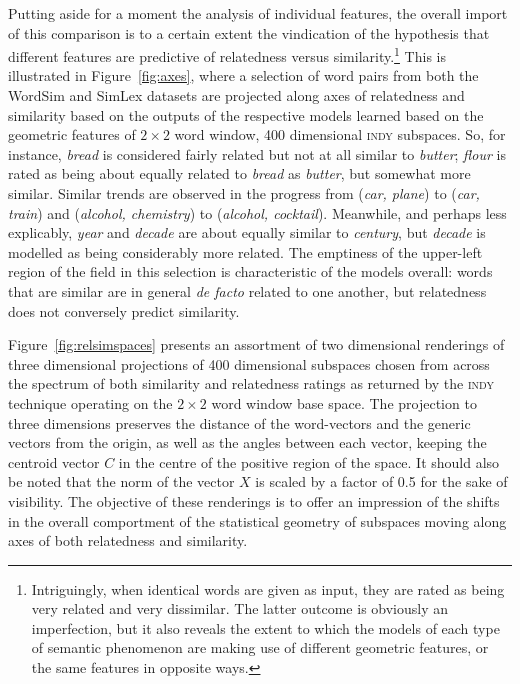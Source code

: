 Putting aside for a moment the analysis of individual features, the overall import of this comparison is to a certain extent the vindication of the hypothesis that different features are predictive of relatedness versus similarity.\footnote{Intriguingly, when identical words are given as input, they are rated as being very related and very dissimilar.  The latter outcome is obviously an imperfection, but it also reveals the extent to which the models of each type of semantic phenomenon are making use of different geometric features, or the same features in opposite ways.}  This is illustrated in Figure~\ref{fig:axes}, where a selection of word pairs from both the WordSim and SimLex datasets are projected along axes of relatedness and similarity based on the outputs of the respective models learned based on the geometric features of $2 \times 2$ word window, 400 dimensional \textsc{indy} subspaces.    So, for instance, \emph{bread} is considered fairly related but not at all similar to \emph{butter}; \emph{flour} is rated as being about equally related to \emph{bread} as \emph{butter}, but somewhat more similar.  Similar trends are observed in the progress from (\emph{car, plane}) to (\emph{car, train}) and (\emph{alcohol, chemistry}) to (\emph{alcohol, cocktail}).  Meanwhile, and perhaps less explicably, \emph{year} and \emph{decade} are about equally similar to \emph{century}, but \emph{decade} is modelled as being considerably more related.  The emptiness of the upper-left region of the field in this selection is characteristic of the models overall: words that are similar are in general \emph{de facto} related to one another, but relatedness does not conversely predict similarity.

Figure~\ref{fig:relsimspaces} presents an assortment of two dimensional renderings of three dimensional projections of 400 dimensional subspaces chosen from across the spectrum of both similarity and relatedness ratings as returned by the \textsc{indy} technique operating on the $2 \times 2$ word window base space.  The projection to three dimensions preserves the distance of the word-vectors and the generic vectors from the origin, as well as the angles between each vector, keeping the centroid vector $C$ in the centre of the positive region of the space.  It should also be noted that the norm of the vector $X$ is scaled by a factor of 0.5 for the sake of visibility.  The objective of these renderings is to offer an impression of the shifts in the overall comportment of the statistical geometry of subspaces moving along axes of both relatedness and similarity.

